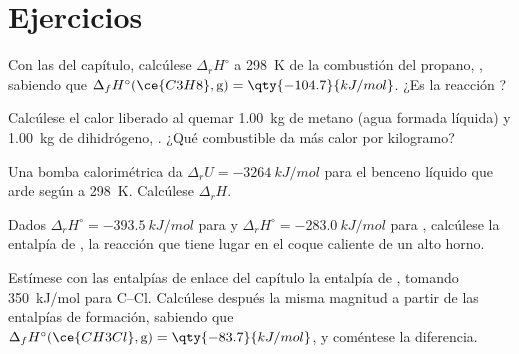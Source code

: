 \section{Ejercicios}

\begin{exercise}[$\star$]\label{exo:b2:reaction-enthalpy:1}
Con las  del capítulo, calcúlese
$\Delta_r H^\circ$ a \qty{298}{K} de la combustión del propano,
, sabiendo que $\Delta_f
H^\circ(\ce{C3H8}, \text{g}) = \qty{-104.7}{kJ/mol}$. ¿Es la reacción
?
\end{exercise}

\begin{exercise}[$\star$]\label{exo:b2:reaction-enthalpy:2}
Calcúlese el calor liberado al quemar \qty{1.00}{kg} de metano (agua
formada líquida) y \qty{1.00}{kg} de dihidrógeno, . ¿Qué combustible da más calor por kilogramo?
\end{exercise}

\begin{exercise}[$\star$]\label{exo:b2:reaction-enthalpy:3}
Una bomba calorimétrica da $\Delta_r U = \qty{-3264}{kJ/mol}$ para el benceno
líquido que arde según  a
\qty{298}{K}. Calcúlese $\Delta_r H$.
\end{exercise}

\begin{exercise}[$\star$]\label{exo:b2:reaction-enthalpy:4}
Dados $\Delta_r H^\circ = \qty{-393.5}{kJ/mol}$ para  y $\Delta_r H^\circ = \qty{-283.0}{kJ/mol}$ para , calcúlese la entalpía de ,
la reacción que tiene lugar en el coque caliente de un alto horno.
\end{exercise}

\begin{exercise}[$\star\star$]\label{exo:b2:reaction-enthalpy:5}
Estímese con las entalpías de enlace del capítulo la entalpía de
, tomando \qty{350}{kJ/mol} para
C--Cl. Calcúlese después la misma magnitud a partir de las entalpías de formación,
sabiendo que $\Delta_f H^\circ(\ce{CH3Cl}, \text{g}) = \qty{-83.7}{kJ/mol}$, y
coméntese la diferencia.
\end{exercise}

